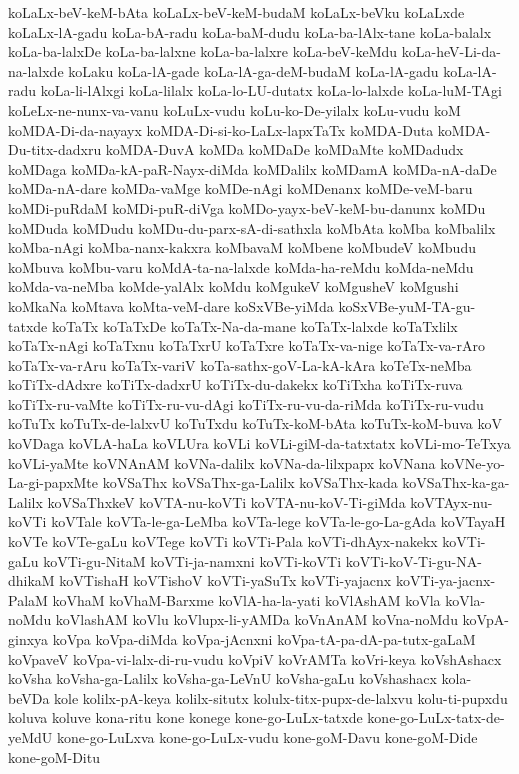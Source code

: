 {koLaLx-beV-keM-bAta
koLaLx-beV-keM-budaM
koLaLx-beVku
koLaLxde
koLaLx-lA-gadu
koLa-bA-radu
koLa-baM-dudu
koLa-ba-lAlx-tane
koLa-balalx
koLa-ba-lalxDe
koLa-ba-lalxne
koLa-ba-lalxre
koLa-beV-keMdu
koLa-heV-Li-da-na-lalxde
koLaku
koLa-lA-gade
koLa-lA-ga-deM-budaM
koLa-lA-gadu
koLa-lA-radu
koLa-li-lAlxgi
koLa-lilalx
koLa-lo-LU-dutatx
koLa-lo-lalxde
koLa-luM-TAgi
koLeLx-ne-nunx-va-vanu
koLuLx-vudu
koLu-ko-De-yilalx
koLu-vudu
koM
koMDA-Di-da-nayayx
koMDA-Di-si-ko-LaLx-lapxTaTx
koMDA-Duta
koMDA-Du-titx-dadxru
koMDA-DuvA
koMDa
koMDaDe
koMDaMte
koMDadudx
koMDaga
koMDa-kA-paR-Nayx-diMda
koMDalilx
koMDamA
koMDa-nA-daDe
koMDa-nA-dare
koMDa-vaMge
koMDe-nAgi
koMDenanx
koMDe-veM-baru
koMDi-puRdaM
koMDi-puR-diVga
koMDo-yayx-beV-keM-bu-danunx
koMDu
koMDuda
koMDudu
koMDu-du-parx-sA-di-sathxla
koMbAta
koMba
koMbalilx
koMba-nAgi
koMba-nanx-kakxra
koMbavaM
koMbene
koMbudeV
koMbudu
koMbuva
koMbu-varu
koMdA-ta-na-lalxde
koMda-ha-reMdu
koMda-neMdu
koMda-va-neMba
koMde-yalAlx
koMdu
koMgukeV
koMgusheV
koMgushi
koMkaNa
koMtava
koMta-veM-dare
koSxVBe-yiMda
koSxVBe-yuM-TA-gu-tatxde
koTaTx
koTaTxDe
koTaTx-Na-da-mane
koTaTx-lalxde
koTaTxlilx
koTaTx-nAgi
koTaTxnu
koTaTxrU
koTaTxre
koTaTx-va-nige
koTaTx-va-rAro
koTaTx-va-rAru
koTaTx-variV
koTa-sathx-goV-La-kA-kAra
koTeTx-neMba
koTiTx-dAdxre
koTiTx-dadxrU
koTiTx-du-dakekx
koTiTxha
koTiTx-ruva
koTiTx-ru-vaMte
koTiTx-ru-vu-dAgi
koTiTx-ru-vu-da-riMda
koTiTx-ru-vudu
koTuTx
koTuTx-de-lalxvU
koTuTxdu
koTuTx-koM-bAta
koTuTx-koM-buva
koV
koVDaga
koVLA-haLa
koVLUra
koVLi
koVLi-giM-da-tatxtatx
koVLi-mo-TeTxya
koVLi-yaMte
koVNAnAM
koVNa-dalilx
koVNa-da-lilxpapx
koVNana
koVNe-yo-La-gi-papxMte
koVSaThx
koVSaThx-ga-Lalilx
koVSaThx-kada
koVSaThx-ka-ga-Lalilx
koVSaThxkeV
koVTA-nu-koVTi
koVTA-nu-koV-Ti-giMda
koVTAyx-nu-koVTi
koVTale
koVTa-le-ga-LeMba
koVTa-lege
koVTa-le-go-La-gAda
koVTayaH
koVTe
koVTe-gaLu
koVTege
koVTi
koVTi-Pala
koVTi-dhAyx-nakekx
koVTi-gaLu
koVTi-gu-NitaM
koVTi-ja-namxni
koVTi-koVTi
koVTi-koV-Ti-gu-NA-dhikaM
koVTishaH
koVTishoV
koVTi-yaSuTx
koVTi-yajacnx
koVTi-ya-jacnx-PalaM
koVhaM
koVhaM-Barxme
koVlA-ha-la-yati
koVlAshAM
koVla
koVla-noMdu
koVlashAM
koVlu
koVlupx-li-yAMDa
koVnAnAM
koVna-noMdu
koVpA-ginxya
koVpa
koVpa-diMda
koVpa-jAcnxni
koVpa-tA-pa-dA-pa-tutx-gaLaM
koVpaveV
koVpa-vi-lalx-di-ru-vudu
koVpiV
koVrAMTa
koVri-keya
koVshAshacx
koVsha
koVsha-ga-Lalilx
koVsha-ga-LeVnU
koVsha-gaLu
koVshashacx
kola-beVDa
kole
kolilx-pA-keya
kolilx-situtx
kolulx-titx-pupx-de-lalxvu
kolu-ti-pupxdu
koluva
koluve
kona-ritu
kone
konege
kone-go-LuLx-tatxde
kone-go-LuLx-tatx-de-yeMdU
kone-go-LuLxva
kone-go-LuLx-vudu
kone-goM-Davu
kone-goM-Dide
kone-goM-Ditu
}
